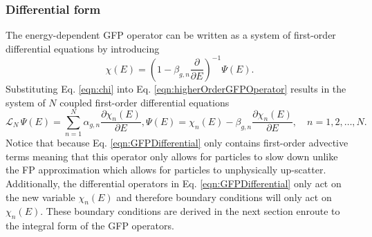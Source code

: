\documentclass[../main.tex]{subfiles}
\begin{document}
\subsubsection{Differential form}
The energy-dependent GFP operator can be written as a system of first-order differential equations by introducing
\begin{equation} \label{eqn:chi}
  \chi(E) = \left(1 - \beta_{g,n} \dfrac{\partial}{\partial E}\right)^{-1} \Psi(E).
\end{equation}
Substituting Eq. \eqref{eqn:chi} into Eq. \eqref{eqn:higherOrderGFPOperator} results in the system of $N$ coupled first-order differential equations
\begin{subequations} \label{eqn:GFPDifferential}
  \begin{equation}
    \mathcal{L}_N \, \Psi(E) = \sum_{n=1}^{N} \alpha_{g,n} \dfrac{\partial \chi_n(E)}{\partial E},
  \end{equation}
  \begin{equation}
    \Psi(E) = \chi_n(E) - \beta_{g,n} \dfrac{\partial \chi_n(E)}{\partial E}, \quad n = 1,2,\ldots,N.
  \end{equation}
\end{subequations}
Notice that because Eq. \eqref{eqn:GFPDifferential} only contains first-order advective terms meaning that this operator only allows for particles to slow down unlike the FP approximation which allows for particles to unphysically up-scatter. Additionally, the differential operators in Eq. \eqref{eqn:GFPDifferential} only act on the new variable $\chi_n(E)$ and therefore boundary conditions will only act on $\chi_n(E)$. These boundary conditions are derived in the next section enroute to the integral form of the GFP operators.
\end{document}
